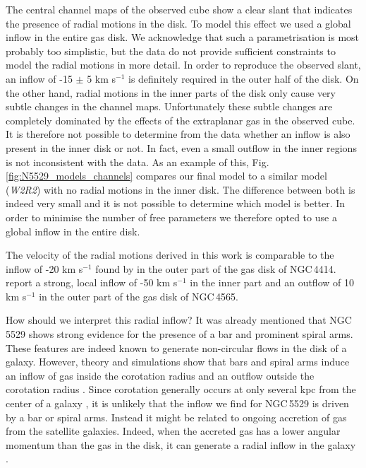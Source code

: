 \documentclass{aa}
\begin{document}
The central channel maps of the observed cube show a clear slant that indicates the presence of radial motions in the disk. To model this effect we used a global inflow in the entire gas disk. We acknowledge that such a parametrisation is most probably too simplistic, but the data do not provide sufficient constraints to model the radial motions in more detail. In order to reproduce the observed slant, an inflow of -15 $\pm$ 5 km s$^{-1}$ is definitely required in the outer half of the disk. On the other hand, radial motions in the inner parts of the disk only cause very subtle changes in the channel maps. Unfortunately these subtle changes are completely dominated by the effects of the extraplanar gas in the observed cube. It is therefore not possible to determine from the data whether an inflow is also present in the inner disk or not. In fact, even a small outflow in the inner regions is not inconsistent with the data. As an example of this, Fig. \ref{fig:N5529_models_channels} compares our final model to a similar model (\textit{W2R2}) with no radial motions in the inner disk. The difference between both is indeed very small and it is not possible to determine which model is better. In order to minimise the number of free parameters we therefore opted to use a global inflow in the entire disk.
\par
The velocity of the radial motions derived in this work is comparable to the inflow of -20 km s$^{-1}$ found by \cite{deblok14} in the outer part of the gas disk of NGC\,4414. \cite{zschaechner12} report a strong, local inflow of -50 km s$^{-1}$ in the inner part and an outflow of 10 km s$^{-1}$ in the outer part of the gas disk of NGC\,4565.
\par
How should we interpret this radial inflow? It was already mentioned that NGC\,5529 shows strong evidence for the presence of a bar and prominent spiral arms. These features are indeed known to generate non-circular flows in the disk of a galaxy. However, theory and simulations show that bars and spiral arms induce an inflow of gas inside the corotation radius and an outflow outside the corotation radius \citep{kenney94,kormendy04}. Since corotation generally occurs at only several kpc from the center of a galaxy \citep{elmegreen92}, it is unlikely that the inflow we find for NGC\,5529 is driven by a bar or spiral arms. Instead it might be related to ongoing accretion of gas from the satellite galaxies. Indeed, when the accreted gas has a lower angular momentum than the gas in the disk, it can generate a radial inflow in the galaxy \citep{matteucci12}.
\end{document}

